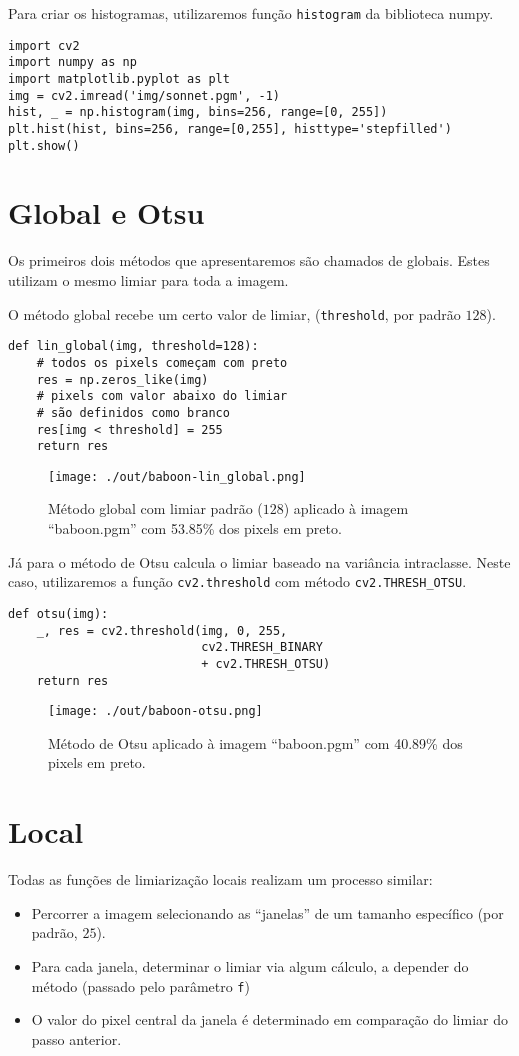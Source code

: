 \documentclass[twocolumn, 10pt]{article}
\begin{document}
Para criar os histogramas, utilizaremos função \texttt{histogram} da biblioteca numpy.
\begin{verbatim}
import cv2
import numpy as np
import matplotlib.pyplot as plt
img = cv2.imread('img/sonnet.pgm', -1)
hist, _ = np.histogram(img, bins=256, range=[0, 255])
plt.hist(hist, bins=256, range=[0,255], histtype='stepfilled')
plt.show()
\end{verbatim}

\section*{Global e Otsu}
\label{sec:org60b4382}
Os primeiros dois métodos que apresentaremos são chamados de globais.
Estes utilizam o mesmo limiar para toda a imagem.

O método global recebe um certo valor de limiar, (\texttt{threshold}, por padrão \(128\)).
\begin{verbatim}
def lin_global(img, threshold=128):
    # todos os pixels começam com preto
    res = np.zeros_like(img)
    # pixels com valor abaixo do limiar
    # são definidos como branco
    res[img < threshold] = 255
    return res
\end{verbatim}
\begin{figure}[htbp]
\centering
\texttt{[image: ./out/baboon-lin\_global.png]}
\caption{Método global com limiar padrão (\(128\)) aplicado à imagem ``baboon.pgm'' com 53.85\% dos pixels em preto.}
\end{figure}

Já para o método de Otsu calcula o limiar baseado na variância intraclasse. Neste caso, utilizaremos a função \texttt{cv2.threshold} com método \texttt{cv2.THRESH\_OTSU}.
\begin{verbatim}
def otsu(img):
    _, res = cv2.threshold(img, 0, 255,
                           cv2.THRESH_BINARY
                           + cv2.THRESH_OTSU)
    return res
\end{verbatim}
\begin{figure}[htbp]
\centering
\texttt{[image: ./out/baboon-otsu.png]}
\caption{Método de Otsu aplicado à imagem ``baboon.pgm'' com 40.89\% dos pixels em preto.}
\end{figure}

\section*{Local}
\label{sec:org24f3565}
Todas as funções de limiarização locais realizam um processo similar:
\begin{itemize}
\item Percorrer a imagem selecionando as ``janelas'' de um tamanho específico (por padrão, \(25\)).
\item Para cada janela, determinar o limiar via algum cálculo, a depender do método (passado pelo parâmetro \texttt{f})
\item O valor do pixel central da janela é determinado em comparação do limiar do passo anterior.
\end{itemize}
\end{document}
